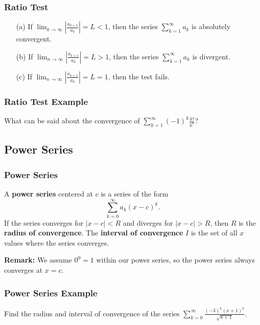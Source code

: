 \documentclass{beamer}
\begin{document}
 \begin{frame}
   \frametitle{Ratio Test}
   \begin{Theorem}
   \begin{enumerate}
   \item[(a)] If $\displaystyle\lim_{k\to\infty} \left|\frac{a_{k + 1}}{a_k}\right| = L < 1$, then the series $\displaystyle\sum_{k = 1}^\infty a_k$ is absolutely convergent.
   \item[(b)] If $\displaystyle\lim_{n\to\infty}\left|\frac{a_{k + 1}}{a_k}\right| = L > 1$, then the series $\displaystyle\sum_{k = 1}^\infty a_k$  is divergent.
   \item[(c)] If $\displaystyle\lim_{n\to\infty}\left|\frac{a_{k + 1}}{a_k}\right| = L = 1$, then the test fails.
   \end{enumerate}
   \end{Theorem}
 \end{frame}
 
 \begin{frame}[t]
  \frametitle{Ratio Test Example} 
  \begin{Example}
What can be said about the convergence of $\displaystyle\sum_{k = 1}^\infty (-1)^k\frac{k!}{k^k}$?
\end{Example}
\end{frame}

\subsection{Power Series}

\begin{frame}
\frametitle{Power Series}
\begin{Definition}
A {\bf power series} centered at $c$ is a series of the form
$$
\sum_{k = 0}^\infty a_k (x - c)^k.
$$
If the series converges for $|x - c| < R$ and diverges for $|x - c| > R$, then $R$ is the {\bf radius of convergence}. The {\bf interval of convergence} $I$ is the set of all $x$ values where the series converges. 
\end{Definition}
{\bf Remark:} We assume $0^0 = 1$ within our power series, so the power series always converges at $x = c$.
\end{frame}

\begin{frame}[t]
\frametitle{Power Series Example}
\begin{Example}
Find the radius and interval of convergence of the series $\displaystyle\sum_{k = 0}^\infty \frac{(-3)^k (x + 1)^k}{\sqrt{k + 1}}$.
\end{Example}

\end{frame}
\end{document}
